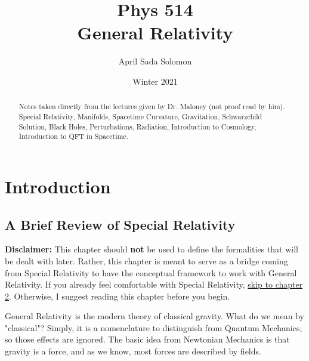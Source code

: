 \documentclass{article}
\title{Phys 514 \\
	\large General Relativity}
\author{April Sada Solomon}
\date{Winter 2021}
\begin{document}
	\clearpage
	\maketitle
	
	\vspace{2cm}
	
	\renewcommand{\abstractname}{Course Description}
	\begin{abstract}
		 Notes taken directly from the lectures given by Dr. Maloney (not proof read by him). Special Relativity, Manifolds, Spacetime Curvature, Gravitation, Schwarzchild Solution, Black Holes, Perturbations, Radiation, Introduction to Cosmology, Introduction to QFT in Spacetime. 
	\end{abstract}
	
	\newpage
	
	\tableofcontents
	
	\newpage
	
	\setcounter{page}{1}
	\cfoot{\thepage}
	
	\section{Introduction}
	\subsection{A Brief Review of Special Relativity}
	
		\textbf{Disclaimer:} This chapter should \textbf{not} be used to define the formalities that will be dealt with later. Rather, this chapter is meant to serve as a bridge coming from Special Relativity to have the conceptual framework to work with General Relativity. If you already feel comfortable with Special Relativity, \hyperref[ch:2]{skip to chapter 2}. Otherwise, I suggest reading this chapter before you begin.
	
 		General Relativity is the modern theory of classical gravity. What do we mean by "classical"? Simply, it is a nomenclature to distinguish from Quantum Mechanics, so those effects are ignored. The basic idea from Newtonian Mechanics is that gravity is a force, and as we know, most forces are described by fields.
 		
\end{document}
